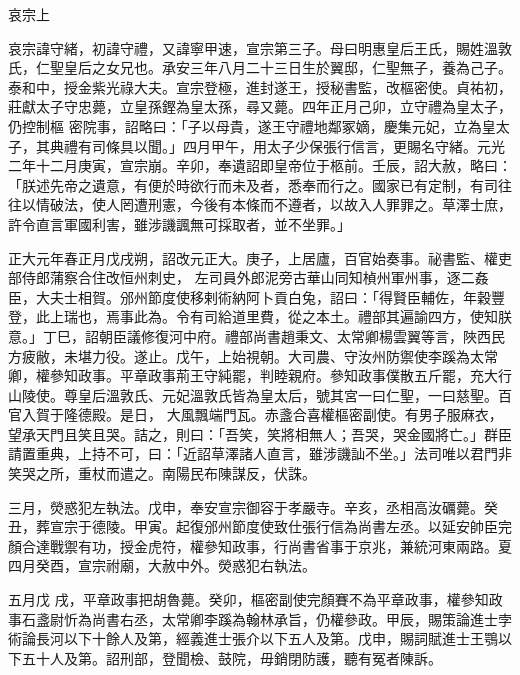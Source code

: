 
\begin{pinyinscope}

 哀宗上



 哀宗諱守緒，初諱守禮，又諱寧甲速，宣宗第三子。母曰明惠皇后王氏，賜姓溫敦氏，仁聖皇后之女兄也。承安三年八月二十三日生於翼邸，仁聖無子，養為己子。泰和中，授金紫光祿大夫。宣宗登極，進封遂王，授秘書監，改樞密使。貞祐初，莊獻太子守忠薨，立皇孫鏗為皇太孫，尋又薨。四年正月己卯，立守禮為皇太子，仍控制樞
 密院事，詔略曰：「子以母貴，遂王守禮地鄰冢嫡，慶集元妃，立為皇太子，其典禮有司條具以聞。」四月甲午，用太子少保張行信言，更賜名守緒。元光二年十二月庚寅，宣宗崩。辛卯，奉遺詔即皇帝位于柩前。壬辰，詔大赦，略曰：「朕述先帝之遺意，有便於時欲行而未及者，悉奉而行之。國家已有定制，有司往往以情破法，使人罔遭刑憲，今後有本條而不遵者，以故入人罪罪之。草澤士庶，許令直言軍國利害，雖涉譏諷無可採取者，並不坐罪。」



 正大元年春正月戊戌朔，詔改元正大。庚子，上居廬，百官始奏事。祕書監、權吏部侍郎蒲察合住改恒州刺史，
 左司員外郎泥旁古華山同知楨州軍州事，逐二姦臣，大夫士相賀。邠州節度使移剌術納阿卜貢白兔，詔曰：「得賢臣輔佐，年穀豐登，此上瑞也，焉事此為。令有司給道里費，從之本土。禮部其遍諭四方，使知朕意。」丁巳，詔朝臣議修復河中府。禮部尚書趙秉文、太常卿楊雲翼等言，陜西民方疲敝，未堪力役。遂止。戊午，上始視朝。大司農、守汝州防禦使李蹊為太常卿，權參知政事。平章政事荊王守純罷，判睦親府。參知政事僕散五斤罷，充大行山陵使。尊皇后溫敦氏、元妃溫敦氏皆為皇太后，號其宮一曰仁聖，一曰慈聖。百官入賀于隆德殿。是日，
 大風飄端門瓦。赤盞合喜權樞密副使。有男子服麻衣，望承天門且笑且哭。詰之，則曰：「吾笑，笑將相無人；吾哭，哭金國將亡。」群臣請置重典，上持不可，曰：「近詔草澤諸人直言，雖涉譏訕不坐。」法司唯以君門非笑哭之所，重杖而遣之。南陽民布陳謀反，伏誅。



 三月，熒惑犯左執法。戊申，奉安宣宗御容于孝嚴寺。辛亥，丞相高汝礪薨。癸丑，葬宣宗于德陵。甲寅。起復邠州節度使致仕張行信為尚書左丞。以延安帥臣完顏合達戰禦有功，授金虎符，權參知政事，行尚書省事于京兆，兼統河東兩路。夏四月癸酉，宣宗祔廟，大赦中外。熒惑犯右執法。



 五月戊
 戌，平章政事把胡魯薨。癸卯，樞密副使完顏賽不為平章政事，權參知政事石盞尉忻為尚書右丞，太常卿李蹊為翰林承旨，仍權參政。甲辰，賜策論進士孛術論長河以下十餘人及第，經義進士張介以下五人及第。戊申，賜詞賦進士王鶚以下五十人及第。詔刑部，登聞檢、鼓院，毋銷閉防護，聽有冤者陳訴。




\end{pinyinscope}
